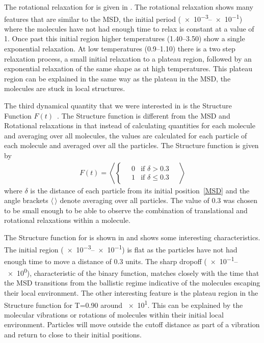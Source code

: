 The rotational relaxation for \sone is given in . The rotational relaxation shows many features that are similar to the MSD, the initial period (\numrange{e-3}{e-1}) where the molecules have not had enough time to relax is constant at a value of \num{1}. Once past this initial region higher temperatures (\numrange{1.40}{3.50}) show a single exponential relaxation. At low temperatures (\numrange{0.9}{1.10}) there is a two step relaxation process, a small initial relaxation to a plateau region, followed by an exponential relaxation of the same shape as at high temperatures. This plateau region can be explained in the same way as the plateau in the MSD, the molecules are stuck in local structures.

The third dynamical quantity that we were interested in is the Structure Function $F(t)$~. The Structure function is different from the MSD and Rotational relaxations in that instead of calculating quantities for each molecule and averaging over all molecules, the values are calculated for each particle of each molecule and averaged over all the particles. The Structure function is given by
\begin{align}
    F(t) = \left \langle \begin{cases}
        \quad0 &\text{if } \delta > 0.3 \\
        \quad1 &\text{if } \delta \leq 0.3
    \end{cases} \quad \right \rangle
    \label{eq:struct}
\end{align}
where $\delta$ is the distance of each particle from its initial position~\eqref{MSD} and the angle brackets $\langle\,\rangle$ denote averaging over all particles. The value of \num{0.3} was chosen to be small enough to be able to observe the combination of translational and rotational relaxations within a molecule.

The Structure function for \sone is shown in  and shows some interesting characteristics. The initial region (\numrange{e-3}{e-1}) is flat as the particles have not had enough time to move a distance of \num{0.3} units. The sharp dropoff (\numrange{e-1}{e0}), characteristic of the binary function, matches closely with the time that the MSD transitions from the ballistic regime indicative of the molecules escaping their local environment. The other interesting feature is the plateau region in the Structure function for T=0.90 around \num{e1}. This can be explained by the molecular vibrations or rotations of molecules within their initial local environment. Particles will move outside the cutoff distance as part of a vibration and return to close to their initial positions.

